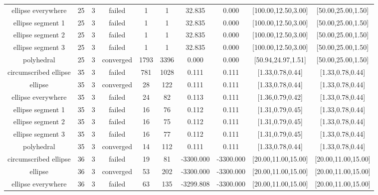 \begin{tiny}
\begin{center}
\begin{tabular}{ c c c c c c c c c c }
    ellipse everywhere    &   25  &  3  &   failed   &   1   &   1   &   32.835   &   0.000    & [100.00,12.50,3.00] & [50.00,25.00,1.50] \\
    ellipse segment 1     &   25  &  3  &   failed   &   1   &   1   &   32.835   &   0.000    & [100.00,12.50,3.00] & [50.00,25.00,1.50] \\
    ellipse segment 2     &   25  &  3  &   failed   &   1   &   1   &   32.835   &   0.000    & [100.00,12.50,3.00] & [50.00,25.00,1.50] \\
    ellipse segment 3     &   25  &  3  &   failed   &   1   &   1   &   32.835   &   0.000    & [100.00,12.50,3.00] & [50.00,25.00,1.50] \\
        polyhedral        &   25  &  3  & converged  &  1793 &  3396 &   0.000    &   0.000    & [50.94,24.97,1.51] & [50.00,25.00,1.50] \\
  circumscribed ellipse   &   35  &  3  &   failed   &  781  &  1028 &   0.111    &   0.111    & [1.33,0.78,0.44] & [1.33,0.78,0.44] \\
         ellipse          &   35  &  3  & converged  &   28  &  122  &   0.111    &   0.111    & [1.33,0.78,0.44] & [1.33,0.78,0.44] \\
    ellipse everywhere    &   35  &  3  &   failed   &   24  &   82  &   0.113    &   0.111    & [1.36,0.79,0.42] & [1.33,0.78,0.44] \\
    ellipse segment 1     &   35  &  3  &   failed   &   16  &   76  &   0.112    &   0.111    & [1.31,0.79,0.45] & [1.33,0.78,0.44] \\
    ellipse segment 2     &   35  &  3  &   failed   &   16  &   75  &   0.112    &   0.111    & [1.31,0.79,0.45] & [1.33,0.78,0.44] \\
    ellipse segment 3     &   35  &  3  &   failed   &   16  &   77  &   0.112    &   0.111    & [1.31,0.79,0.45] & [1.33,0.78,0.44] \\
        polyhedral        &   35  &  3  & converged  &   14  &  112  &   0.111    &   0.111    & [1.33,0.78,0.44] & [1.33,0.78,0.44] \\
  circumscribed ellipse   &   36  &  3  &   failed   &   19  &   81  & -3300.000  & -3300.000  & [20.00,11.00,15.00] & [20.00,11.00,15.00] \\
         ellipse          &   36  &  3  & converged  &   53  &  202  & -3300.000  & -3300.000  & [20.00,11.00,15.00] & [20.00,11.00,15.00] \\
    ellipse everywhere    &   36  &  3  &   failed   &   63  &  135  & -3299.808  & -3300.000  & [20.00,11.00,15.00] & [20.00,11.00,15.00] \\

\end{tabular}
\end{center}
\end{tiny}
